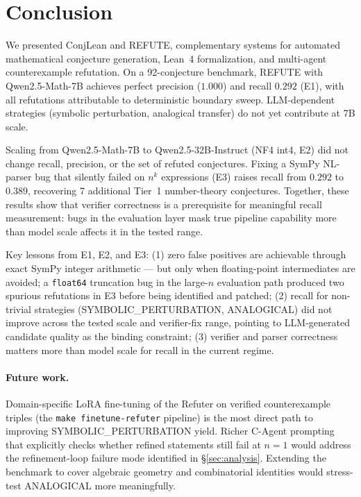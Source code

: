 \section{Conclusion}
\label{sec:conclusion}

We presented ConjLean and REFUTE, complementary systems for automated
mathematical conjecture generation, Lean~4 formalization, and multi-agent
counterexample refutation.
On a 92-conjecture benchmark, REFUTE with Qwen2.5-Math-7B achieves perfect
precision ($1.000$) and recall $0.292$ (E1), with all refutations attributable to
deterministic boundary sweep.
LLM-dependent strategies (symbolic perturbation, analogical transfer) do not
yet contribute at 7B scale.

Scaling from Qwen2.5-Math-7B to Qwen2.5-32B-Instruct (NF4 int4, E2) did not
change recall, precision, or the set of refuted conjectures.
Fixing a SymPy NL-parser bug that silently failed on $n^k$ expressions (E3)
raises recall from $0.292$ to $0.389$, recovering 7 additional Tier~1
number-theory conjectures.
Together, these results show that verifier correctness is a prerequisite for
meaningful recall measurement: bugs in the evaluation layer mask true pipeline
capability more than model scale affects it in the tested range.

Key lessons from E1, E2, and E3:
(1) zero false positives are achievable through exact SymPy integer arithmetic
--- but only when floating-point intermediates are avoided; a \texttt{float64}
truncation bug in the large-$n$ evaluation path produced two spurious
refutations in E3 before being identified and patched;
(2) recall for non-trivial strategies (SYMBOLIC\_PERTURBATION, ANALOGICAL)
did not improve across the tested scale and verifier-fix range, pointing to
LLM-generated candidate quality as the binding constraint;
(3) verifier and parser correctness matters more than model scale for recall
in the current regime.

\paragraph{Future work.}
Domain-specific LoRA fine-tuning of the Refuter on verified counterexample
triples (the \texttt{make finetune-refuter} pipeline) is the most direct path
to improving SYMBOLIC\_PERTURBATION yield.
Richer C-Agent prompting that explicitly checks whether refined statements
still fail at $n=1$ would address the refinement-loop failure mode identified
in \S\ref{sec:analysis}.
Extending the benchmark to cover algebraic geometry and combinatorial
identities would stress-test ANALOGICAL more meaningfully.
